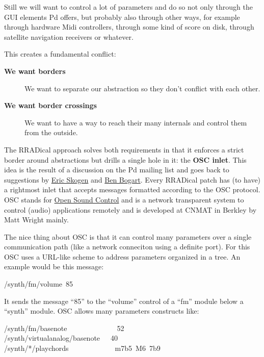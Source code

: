 \documentclass[10pt,english]{scrartcl}
\begin{document}
Still we will want to control a lot of parameters and do so not only through
the GUI elements Pd offers, but probably also through other ways, for
example through hardware Midi controllers, through some kind of score on
disk, through satellite navigation receivers or whatever.

This creates a fundamental conflict:
\begin{description}
\item[\textbf{We want borders}   ]

We want to separate our abstraction so they don't conflict with each
other.

\item[\textbf{We want border crossings}]

We want to have a way to reach their many internals and control them
from the outside.

\end{description}

The RRADical approach solves both requirements in that it enforces a strict
border around abstractions but drills a single hole in it: the \textbf{OSC
inlet}. This idea is the result of a discussion on the Pd mailing list and
goes back to suggestions by \href{http://www.audionerd.com}{Eric Skogen} and \href{http://www.ekran.org/ben/}{Ben Bogart}. Every RRADical
patch has (to have) a rightmost inlet that accepts messages formatted
according to the OSC protocol. OSC stands for \href{http://www.cnmat.berkeley.edu/OpenSoundControl/}{Open Sound Control} and is a
network transparent system to control (audio) applications remotely and is
developed at CNMAT in Berkley by Matt Wright mainly.

The nice thing about OSC is that it can control many parameters over a
single communication path (like a network conneciton using a definite port).
For this OSC uses a URL-like scheme to address parameters organized in a
tree. An example would be this message:
\begin{ttfamily}\begin{flushleft}
\mbox{/synth/fm/volume~85}
\end{flushleft}\end{ttfamily}

It sends the message ``85'' to the ``volume'' control of a ``fm'' module below a
``synth'' module. OSC allows many parameters constructs like:
\begin{ttfamily}\begin{flushleft}
\mbox{/synth/fm/basenote~~~~~~~~~~~~~~52}\\
\mbox{/synth/virtualanalog/basenote~~~40}\\
\mbox{/synth/*/playchords~~~~~~~~~~~~~m7b5~M6~7b9}
\end{flushleft}\end{ttfamily}
\end{document}
